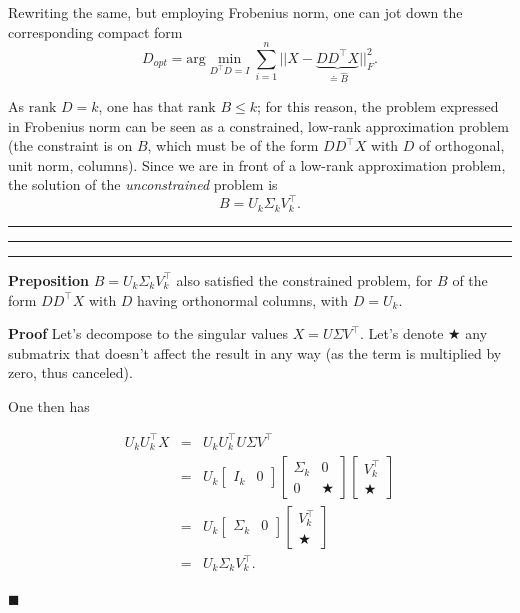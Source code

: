 \documentclass[10pt]{report}
\begin{document}
Rewriting the same, but employing Frobenius norm, one can jot down the corresponding compact form
$$D_{opt} = \mbox{arg} \min_{D^\top D = I} \sum_{i=1}^n ||X - \underbrace{DD^\top X}_{\doteq \hat B}||^2_F.$$

As \(\mbox{rank }D = k\), one has that \(\mbox{rank }B \leq k\); for this reason, the problem expressed in Frobenius norm can be seen as a constrained, low\--rank approximation problem (the constraint is on \(B\), which must be of the form \(DD^\top X\) with \(D\) of orthogonal, unit norm, columns). Since we are in front of a low\--rank approximation problem, the solution of the \emph{unconstrained} problem is $$B = U_k\Sigma_k V^\top_k.$$

\vspace*{0.6cm}\hrule
\hrule
\hrule
\vspace*{0.4cm}
\textbf{Preposition} \(B = U_k\Sigma_k V^\top_k\) also satisfied the constrained problem, for \(B\) of the form \(DD^\top X\) with \(D\) having orthonormal columns, with \(D = U_k\).

\textbf{Proof} Let's decompose to the singular values \(X = U\Sigma V^\top\). Let's denote \(\bigstar\) any submatrix that doesn't affect the result in any way (as the term is multiplied by zero, thus canceled).

One then has

\[\begin{array}{rcl} U_k U^\top_k X & = & U_k U^\top_k U \Sigma V^\top \\ & = & U_k \begin{bmatrix}I_k & 0 \end{bmatrix}\begin{bmatrix}\Sigma_k & 0 \\ 0 & \bigstar \end{bmatrix}\begin{bmatrix}V^\top_k \\ \bigstar \end{bmatrix} \\ & = & U_k\begin{bmatrix}\Sigma_k & 0 \end{bmatrix}\begin{bmatrix}V^\top_k \\ \bigstar \end{bmatrix} \\ & = & U_k \Sigma_k V^\top_k. \end{array}\]

\begin{flushright}
$\blacksquare$
\end{flushright}
\end{document}
